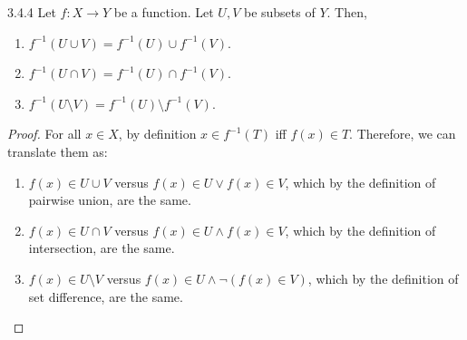 \begin{exercise}{3.4.4}
	Let $f: X \to Y$ be a function. Let $U,V$ be subsets of $Y$. Then,
	\begin{enumerate}
		\item $f^{-1}(U \cup V) = f^{-1}(U) \cup f^{-1}(V)$.
		\item $f^{-1}(U \cap V) = f^{-1}(U) \cap f^{-1}(V)$.
		\item $f^{-1}(U \setminus V) = f^{-1}(U) \setminus f^{-1}(V)$.
	\end{enumerate}
\end{exercise}
\begin{proof}
	For all $x \in X$, by definition $x \in f^{-1}(T)$ iff $f(x) \in T$. Therefore, we can translate them as:
	\begin{enumerate}
		\item $f(x) \in U \cup V$ versus $f(x) \in U \vee f(x) \in V$, which by the definition of pairwise union, are the same.
		\item $f(x) \in U \cap V$ versus $f(x) \in U \wedge f(x) \in V$, which by the definition of intersection, are the same.
		\item $f(x) \in U \setminus V$ versus $f(x) \in U \wedge \neg(f(x) \in V)$, which by the definition of set difference, are the same.
	\end{enumerate}
\end{proof}

